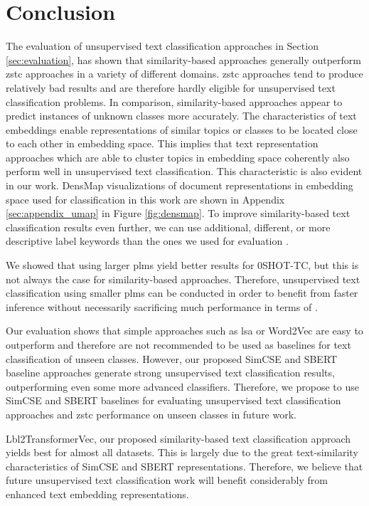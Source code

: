 \documentclass[sigconf]{acmart}
\begin{document}
\section{Conclusion}
The evaluation of unsupervised text classification approaches in Section \ref{sec:evaluation}, has shown that similarity-based approaches generally outperform \ac{zstc} approaches in a variety of different domains. \ac{zstc} approaches tend to produce relatively bad results and are therefore hardly eligible for unsupervised text classification problems. In comparison, similarity-based approaches appear to predict instances of unknown classes more accurately. The characteristics of text embeddings enable representations of similar topics or classes to be located close to each other in embedding space. This implies that text representation approaches which are able to cluster topics in embedding space coherently also perform well in unsupervised text classification. This characteristic is also evident in our work. DensMap \cite{Narayan2020DensityPreservingDV} visualizations of document representations in embedding space used for classification in this work are shown in Appendix \ref{sec:appendix_umap} in Figure \ref{fig:densmap}. To improve similarity-based text classification results even further, we can use additional, different, or more descriptive label keywords than the ones we used for evaluation \cite{haj-yahia-etal-2019-towards, webist21}. 


We showed that using larger \acp{plm} yield better results for 0SHOT-TC, but this is not always the case for similarity-based approaches. Therefore, unsupervised text classification using smaller \acp{plm} can be conducted in order to benefit from faster inference without necessarily sacrificing much performance in terms of .

Our evaluation shows that simple approaches such as \ac{lsa} or Word2Vec are easy to outperform and therefore are not recommended to be used as baselines for text classification of unseen classes. However, our proposed SimCSE and SBERT baseline approaches generate strong unsupervised text classification results, outperforming even some more advanced classifiers. Therefore, we propose to use SimCSE and SBERT baselines for evaluating unsupervised text classification approaches and \ac{zstc} performance on unseen classes in future work. 

Lbl2TransformerVec, our proposed similarity-based text classification approach yields best  for almost all datasets. This is largely due to the great text-similarity characteristics of SimCSE and SBERT representations. Therefore, we believe that future unsupervised text classification work will benefit considerably from enhanced text embedding representations. 
\end{document}
